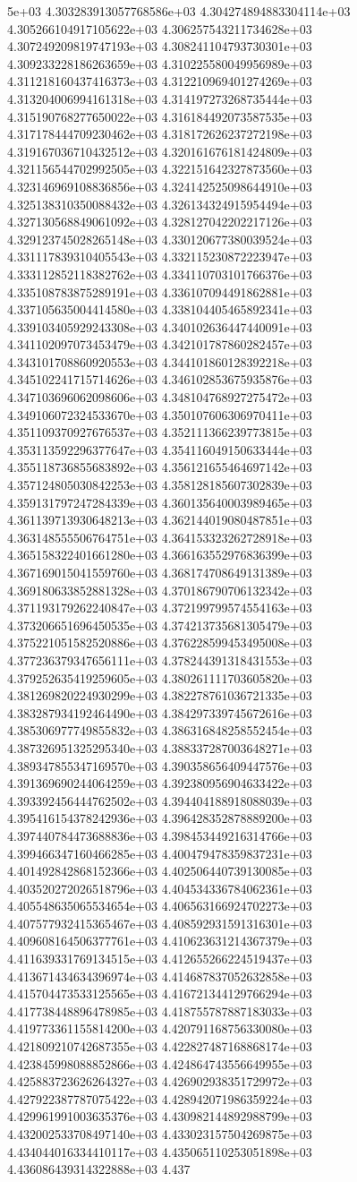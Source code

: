 5e+03	4.303283913057768586e+03	4.304274894883304114e+03	4.305266104917105622e+03	4.306257543211734628e+03	4.307249209819747193e+03	4.308241104793730301e+03	4.309233228186263659e+03	4.310225580049956989e+03	4.311218160437416373e+03	4.312210969401274269e+03	4.313204006994161318e+03	4.314197273268735444e+03	4.315190768277650022e+03	4.316184492073587535e+03	4.317178444709230462e+03	4.318172626237272198e+03	4.319167036710432512e+03	4.320161676181424809e+03	4.321156544702992505e+03	4.322151642327873560e+03	4.323146969108836856e+03	4.324142525098644910e+03	4.325138310350088432e+03	4.326134324915954494e+03	4.327130568849061092e+03	4.328127042202217126e+03	4.329123745028265148e+03	4.330120677380039524e+03	4.331117839310405543e+03	4.332115230872223947e+03	4.333112852118382762e+03	4.334110703101766376e+03	4.335108783875289191e+03	4.336107094491862881e+03	4.337105635004414580e+03	4.338104405465892341e+03	4.339103405929243308e+03	4.340102636447440091e+03	4.341102097073453479e+03	4.342101787860282457e+03	4.343101708860920553e+03	4.344101860128392218e+03	4.345102241715714626e+03	4.346102853675935876e+03	4.347103696062098606e+03	4.348104768927275472e+03	4.349106072324533670e+03	4.350107606306970411e+03	4.351109370927676537e+03	4.352111366239773815e+03	4.353113592296377647e+03	4.354116049150633444e+03	4.355118736855683892e+03	4.356121655464697142e+03	4.357124805030842253e+03	4.358128185607302839e+03	4.359131797247284339e+03	4.360135640003989465e+03	4.361139713930648213e+03	4.362144019080487851e+03	4.363148555506764751e+03	4.364153323262728918e+03	4.365158322401661280e+03	4.366163552976836399e+03	4.367169015041559760e+03	4.368174708649131389e+03	4.369180633852881328e+03	4.370186790706132342e+03	4.371193179262240847e+03	4.372199799574554163e+03	4.373206651696450535e+03	4.374213735681305479e+03	4.375221051582520886e+03	4.376228599453495008e+03	4.377236379347656111e+03	4.378244391318431553e+03	4.379252635419259605e+03	4.380261111703605820e+03	4.381269820224930299e+03	4.382278761036721335e+03	4.383287934192464490e+03	4.384297339745672616e+03	4.385306977749855832e+03	4.386316848258552454e+03	4.387326951325295340e+03	4.388337287003648271e+03	4.389347855347169570e+03	4.390358656409447576e+03	4.391369690244064259e+03	4.392380956904633422e+03	4.393392456444762502e+03	4.394404188918088039e+03	4.395416154378242936e+03	4.396428352878889200e+03	4.397440784473688836e+03	4.398453449216314766e+03	4.399466347160466285e+03	4.400479478359837231e+03	4.401492842868152366e+03	4.402506440739130085e+03	4.403520272026518796e+03	4.404534336784062361e+03	4.405548635065534654e+03	4.406563166924702273e+03	4.407577932415365467e+03	4.408592931591316301e+03	4.409608164506377761e+03	4.410623631214367379e+03	4.411639331769134515e+03	4.412655266224519437e+03	4.413671434634396974e+03	4.414687837052632858e+03	4.415704473533125565e+03	4.416721344129766294e+03	4.417738448896478985e+03	4.418755787887183033e+03	4.419773361155814200e+03	4.420791168756330080e+03	4.421809210742687355e+03	4.422827487168868174e+03	4.423845998088852866e+03	4.424864743556649955e+03	4.425883723626264327e+03	4.426902938351729972e+03	4.427922387787075422e+03	4.428942071986359224e+03	4.429961991003635376e+03	4.430982144892988799e+03	4.432002533708497140e+03	4.433023157504269875e+03	4.434044016334410117e+03	4.435065110253051898e+03	4.436086439314322888e+03	4.437
